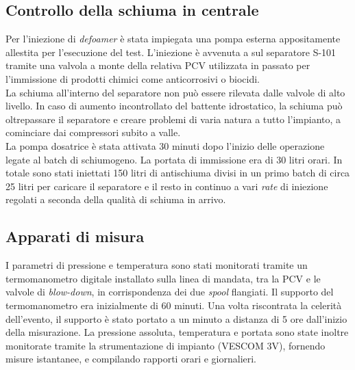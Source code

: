 \subsection{Controllo della schiuma in centrale}
Per l'iniezione di \textit{defoamer} è stata impiegata una pompa esterna appositamente allestita per l'esecuzione del test. L'iniezione è avvenuta a sul separatore S-101 tramite una valvola a monte della relativa PCV utilizzata in passato per l'immissione di prodotti chimici come anticorrosivi o biocidi.\\
La schiuma all'interno del separatore non può essere rilevata dalle valvole di alto livello. In caso di aumento incontrollato del battente idrostatico, la schiuma può oltrepassare il separatore e creare problemi di varia natura a tutto l'impianto, a cominciare dai compressori subito a valle.\\
La pompa dosatrice è stata attivata 30 minuti dopo l'inizio delle operazione legate al batch di schiumogeno. La portata di immissione era di 30 litri orari. In totale sono stati iniettati 150 litri di antischiuma divisi in un primo batch di circa 25 litri per caricare il separatore e il resto in continuo a vari \textit{rate} di iniezione regolati a seconda della qualità di schiuma in arrivo. 

\subsection{Apparati di misura}
I parametri di pressione e temperatura sono stati monitorati tramite un termomanometro digitale installato sulla linea di mandata, tra la PCV e le valvole di \textit{blow-down}, in corrispondenza dei due \textit{spool} flangiati. Il supporto del termomanometro era inizialmente di 60 minuti. Una volta riscontrata la celerità dell'evento, il supporto è stato portato a un minuto a distanza di 5 ore dall'inizio della misurazione. La pressione assoluta, temperatura e portata sono state inoltre monitorate tramite la strumentazione di impianto (VESCOM 3V), fornendo misure istantanee, e compilando rapporti orari e giornalieri.

